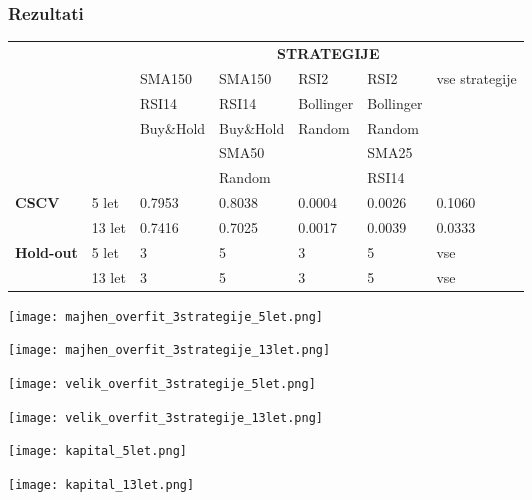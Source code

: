 \documentclass{beamer}
\begin{document}
\begin{frame}
\frametitle{Rezultati}
{\footnotesize
\begin{tabular}{|p{1.15cm}|p{0.8cm}|p{1.4cm}|p{1.4cm}|p{1.2cm}|p{1.2cm}|p{1.2cm}|}
\cline{3-7}
\multicolumn{2}{c|}{}&\multicolumn{5}{|c|}{\textbf{STRATEGIJE}}\\
\cline{3-7}
\multicolumn{2}{c|}{} & SMA150 & SMA150 & RSI2 & RSI2 & \multirow{5}{1cm}{vse strategije} \\
\multicolumn{2}{c|}{} & RSI14 & RSI14 & Bollinger & Bollinger & \\
\multicolumn{2}{c|}{} & Buy\&Hold &  Buy\&Hold  & Random & Random & \\
\multicolumn{2}{c|}{} & & SMA50 & & SMA25 & \\
\multicolumn{2}{c|}{} & & Random &   & RSI14 &  \\
\hline
\multirow{2}{*}{\textbf{CSCV}} & 5 let & 0.7953 & 0.8038 & 0.0004 & 0.0026 & 0.1060 \\
 & 13 let & 0.7416 & 0.7025 & 0.0017 & 0.0039 & 0.0333 \\
\hline
\multirow{2}{*}{\textbf{Hold-out}} & 5 let & 3 & 5 & 3 & 5 & vse \\
 & 13 let & 3 & 5 & 3 & 5 & vse \\
 \hline
\end{tabular}
}
\end{frame}

\begin{frame}
\texttt{[image: majhen\_overfit\_3strategije\_5let.png]}
\end{frame}

\begin{frame}
\texttt{[image: majhen\_overfit\_3strategije\_13let.png]}
\end{frame}

\begin{frame}
\texttt{[image: velik\_overfit\_3strategije\_5let.png]}
\end{frame}

\begin{frame}
\texttt{[image: velik\_overfit\_3strategije\_13let.png]}
\end{frame}

\begin{frame}
\texttt{[image: kapital\_5let.png]}
\end{frame}

\begin{frame}
\texttt{[image: kapital\_13let.png]}
\end{frame}
\end{document}

